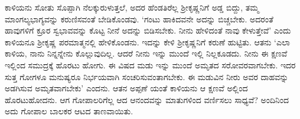 ಕಾಳಿಯನು ಸೋತು ಸೊಪ್ಪಾಗಿ ನೆಲಕ್ಕುರುಳುತ್ತಲೆ, ಅದರ ಹೆಂಡತಿರೆಲ್ಲ ಶ್ರೀಕೃಷ್ಣನಿಗೆ ಅಡ್ಡ ಬಿದ್ದು, ತಮ್ಮ ಮಾಂಗಲ್ಯಭಾಗ್ಯವನ್ನು ಕರುಣಿಸವಂತೆ ಬೇಡಿಕೊಂಡವು. ‘ಗಂಟು ಹಾಕಿದವನೇ ಅದನ್ನು ಬಿಚ್ಚಬೇಕು. ಅದರಂತೆ ಹಾವುಗಳಿಗೆ ಕ್ರೂರ ಸ್ವಭಾವವನ್ನು ಕೊಟ್ಟ ನೀನೆ ಅದನ್ನು ಬಿಡಿಸಬೇಕು. ನೀನು ಹೇಳಿದಂತೆ ನಾವು ಕೇಳುತ್ತೇವೆ’ ಎಂದು ಕಾಳಿಯನೂ ಶ್ರೀಕೃಷ್ಣ ಪರಮಾತ್ಮನಲ್ಲಿ ಹೇಳಿಕೊಂಡನು. ಇದನ್ನು ಕೇಳಿ ಶ್ರೀಕೃಷ್ಣನಿಗೆ ಕರುಣೆ ಹುಟ್ಟಿತು. ಆತನು ‘ಎಲಾ ಕಾಳಿಯ, ನಾನು ನಿನ್ನನ್ನೇನು ಕೊಲ್ಲುವುದಿಲ್ಲ. ಆದರೆ ನೀನು ಇನ್ನು ಮುಂದೆ ಇಲ್ಲಿ ನಿಲ್ಲಕೂಡದು. ನೀನು ಈ ಕ್ಷಣವೆ ಇಲ್ಲಿಂದ ಸಮುದ್ರಕ್ಕೆ ಹೊರಟು ಹೋಗು. ಈ ವಿಷದ ಮಡು ಇನ್ನು ಮುಂದೆ ಅಮೃತದ ಸರೋವರವಾಗಬೇಕು. ಇದರ ಸುತ್ತ ಗೋಗಳೂ ಮನುಷ್ಯರೂ ನಿರ್ಭಯವಾಗಿ ಸಂಚರಿಸುವಂತಾಗಬೇಕು. ಈ ಮಡುವಿನ ನೀರು ಅವರ ದಾಹವನ್ನು ಅಡಗಿಸುವ ಅಮೃತವಾಗಬೇಕು’ ಎಂದನು. ಆತನ ಅಪ್ಪಣೆ ಯಂತೆ ಕಾಳಿಯನು ಆ ಕ್ಷಣವೆ ಅಲ್ಲಿಂದ ಹೊರಟುಹೋದನು. ಆಗ ಗೋಪಾಲರಿಗೆಲ್ಲ ಆದ ಆನಂದವನ್ನು ಮಾತುಗಳಿಂದ ವರ್ಣಿಸಲು ಸಾಧ್ಯವೆ? ಅಂದಿನಿಂದ ಅದು ಗೋಪಾಲ ಬಾಲಕರ ಆಟದ ತಾಣವಾಯಿತು.


